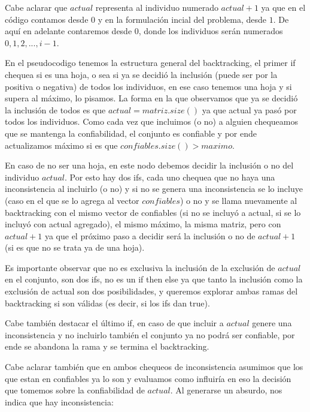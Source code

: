 \documentclass[A4paper,oneside,fleqn,10pt]{article}
\theoremstyle{definition}
\begin{document}
 Cabe aclarar que $actual$ representa al individuo numerado $actual+1$ ya que en el código contamos desde $0$ y en la formulación incial del problema, desde $1$. De aquí en adelante contaremos desde $0$, donde los individuos serán numerados $0, 1, 2,..., i-1$.
 
En el pseudocodigo tenemos la estructura general del backtracking, el primer if chequea si es una hoja, o sea si ya se decidió la inclusión (puede ser por la positiva o negativa) de todos los individuos, en ese caso tenemos una hoja y si supera al máximo, lo pisamos. La forma en la que observamos que ya se decidió la inclusión de todos es que $actual=matriz.size()$ ya que actual ya pasó por todos los individuos. Como cada vez que incluimos (o no) a alguien chequeamos que se mantenga la confiabilidad, el conjunto es confiable y por ende actualizamos máximo si es que $confiables.size()>maximo$.

En caso de no ser una hoja, en este nodo debemos decidir la inclusión o no del individuo $actual$. Por esto hay dos ifs, cada uno chequea que no haya una inconsistencia al incluirlo (o no) y si no se genera una inconsistencia se lo incluye (caso en el que se lo agrega al vector  $confiables$) o no y se llama nuevamente al backtracking con el mismo vector de confiables (si no se incluyó a actual, si se lo incluyó con actual agregado), el mismo máximo, la misma matriz, pero con $actual+1$ ya que el próximo paso a decidir será la inclusión o no de $actual+1$ (si es que no se trata ya de una hoja).

Es importante observar que no es exclusiva la inclusión de la exclusión de $actual$ en el conjunto, son dos ifs, no es un if then else ya que tanto la inclusión como la exclusión de actual son dos posibilidades, y queremos explorar ambas ramas del backtracking si son válidas (es decir, si los ifs dan true).

Cabe también destacar el último if, en caso de que incluir a $actual$ genere una inconsistencia y no incluirlo también el conjunto ya no podrá ser confiable, por ende se abandona la rama y se termina el backtracking.

Cabe aclarar también que en ambos chequeos de inconsistencia asumimos que los que estan en confiables ya lo son y evaluamos como influiría en eso la decisión que tomemos sobre la confiabilidad de $actual$. Al generarse un absurdo, nos indica que hay inconsistencia:
\end{document}
